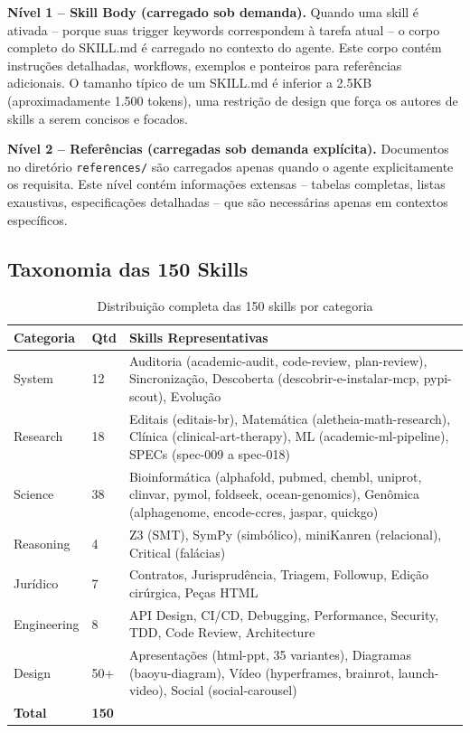 \documentclass[12pt,a4paper,sumario=tradicional,openany]{abntex2}
\begin{document}
\textbf{Nível 1 -- Skill Body (carregado sob demanda).} Quando uma skill é ativada -- porque suas trigger keywords correspondem à tarefa atual -- o corpo completo do SKILL.md é carregado no contexto do agente. Este corpo contém instruções detalhadas, workflows, exemplos e ponteiros para referências adicionais. O tamanho típico de um SKILL.md é inferior a 2.5KB (aproximadamente 1.500 tokens), uma restrição de design que força os autores de skills a serem concisos e focados.

\textbf{Nível 2 -- Referências (carregadas sob demanda explícita).} Documentos no diretório \texttt{references/} são carregados apenas quando o agente explicitamente os requisita. Este nível contém informações extensas -- tabelas completas, listas exaustivas, especificações detalhadas -- que são necessárias apenas em contextos específicos.

\subsection{Taxonomia das 150 Skills}

\begin{table}[H]
\centering
\footnotesize
\caption{Distribuição completa das 150 skills por categoria}
\label{tab:skills-taxonomy}
\begin{tabular}{@{}p{2cm}p{1.2cm}p{9.5cm}@{}}
\toprule
\textbf{Categoria} & \textbf{Qtd} & \textbf{Skills Representativas} \\
\midrule
System & 12 & Auditoria (academic-audit, code-review, plan-review), Sincronização, Descoberta (descobrir-e-instalar-mcp, pypi-scout), Evolução \\
Research & 18 & Editais (editais-br), Matemática (aletheia-math-research), Clínica (clinical-art-therapy), ML (academic-ml-pipeline), SPECs (spec-009 a spec-018) \\
Science & 38 & Bioinformática (alphafold, pubmed, chembl, uniprot, clinvar, pymol, foldseek, ocean-genomics), Genômica (alphagenome, encode-ccres, jaspar, quickgo) \\
Reasoning & 4 & Z3 (SMT), SymPy (simbólico), miniKanren (relacional), Critical (falácias) \\
Jurídico & 7 & Contratos, Jurisprudência, Triagem, Followup, Edição cirúrgica, Peças HTML \\
Engineering & 8 & API Design, CI/CD, Debugging, Performance, Security, TDD, Code Review, Architecture \\
Design & 50+ & Apresentações (html-ppt, 35 variantes), Diagramas (baoyu-diagram), Vídeo (hyperframes, brainrot, launch-video), Social (social-carousel) \\
\midrule
\textbf{Total} & \textbf{150} & \\
\bottomrule
\end{tabular}
\end{table}
\end{document}
